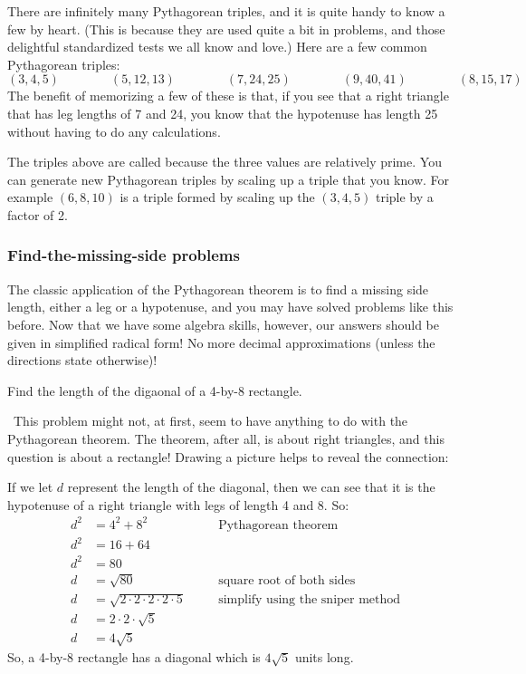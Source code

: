 There are infinitely many Pythagorean triples, and it is quite handy to know a few by heart. (This is because they are used quite a bit in problems, and those delightful standardized tests we all know and love.) Here are a few common Pythagorean triples:
\[
(3, 4, 5) \qquad\qquad
(5, 12, 13) \qquad\qquad
(7, 24, 25) \qquad\qquad
(9, 40, 41) \qquad\qquad
(8, 15, 17)
\]
The benefit of memorizing a few of these is that, if you see that a right triangle that has leg lengths of 7 and 24, you know that the hypotenuse has length 25 without having to do any calculations.

The triples above are called  because the three values are relatively prime. You can generate new Pythagorean triples by scaling up a triple that you know. For example $(6, 8, 10)$ is a triple formed by scaling up the $(3, 4, 5)$ triple by a factor of 2.

\subsubsection{Find-the-missing-side problems}

The classic application of the Pythagorean theorem is to find a missing side length, either a leg or a hypotenuse, and you may have solved problems like this before. Now that we have some algebra skills, however, our answers should be given in simplified radical form! No more decimal approximations (unless the directions state otherwise)!

\begin{boxedex}
Find the length of the digaonal of a 4-by-8 rectangle.

\exsoln\ This problem might not, at first, seem to have anything to do with the Pythagorean theorem. The theorem, after all, is about right triangles, and this question is about a rectangle! Drawing a picture helps to reveal the connection:

\begin{center}\end{center}

If we let $d$ represent the length of the diagonal, then we can see that it is the hypotenuse of a right triangle with legs of length 4 and 8. So:
\begin{align*}
d^2	&= 4^2 + 8^2
&&\quad\text{Pythagorean theorem}\\
d^2&= 16 + 64\\
d^2&= 80\\
d 	&= \sqrt{80}
&&\quad\text{square root of both sides}\\
d 	&= \sqrt{2 \cdot 2 \cdot 2 \cdot 2 \cdot 5}
&&\quad\text{simplify using the sniper method}\\
d 	&= 2 \cdot 2 \cdot \sqrt{5}\\
d 	&= 4\sqrt{5}
\end{align*}
So, a 4-by-8 rectangle has a diagonal which is $4\sqrt5$ units long.
\end{boxedex}

